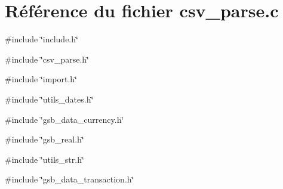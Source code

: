 \section{Référence du fichier csv\_\-parse.c}
\label{csv__parse_8c}
{\ttfamily \#include \char`\"{}include.h\char`\"{}}\par
{\ttfamily \#include \char`\"{}csv\_\-parse.h\char`\"{}}\par
{\ttfamily \#include \char`\"{}import.h\char`\"{}}\par
{\ttfamily \#include \char`\"{}utils\_\-dates.h\char`\"{}}\par
{\ttfamily \#include \char`\"{}gsb\_\-data\_\-currency.h\char`\"{}}\par
{\ttfamily \#include \char`\"{}gsb\_\-real.h\char`\"{}}\par
{\ttfamily \#include \char`\"{}utils\_\-str.h\char`\"{}}\par
{\ttfamily \#include \char`\"{}gsb\_\-data\_\-transaction.h\char`\"{}}\par
